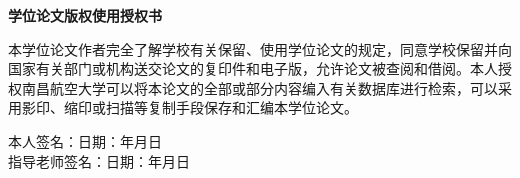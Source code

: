 \vspace{17mm}

\begin{center}
  \heiti{}\textbf{学位论文版权使用授权书}
\end{center}

本学位论文作者完全了解学校有关保留、使用学位论文的规定，同意学校保留并向国家有关部门或机构送交论文的复印件和电子版，允许论文被查阅和借阅。本人授权南昌航空大学可以将本论文的全部或部分内容编入有关数据库进行检索，可以采用影印、缩印或扫描等复制手段保存和汇编本学位论文。

\vspace*{1mm}

\begin{flushright}
  \begin{spacing}{1.65}
    本人签名：\hspace{40mm}日\hspace{2.5mm}期：\hspace{13mm}年\hspace{8mm}月\hspace{8mm}日\\
    指导老师签名：\hspace{40mm}日\hspace{2.5mm}期：\hspace{13mm}年\hspace{8mm}月\hspace{8mm}日
  \end{spacing}
\end{flushright}

\newpage
